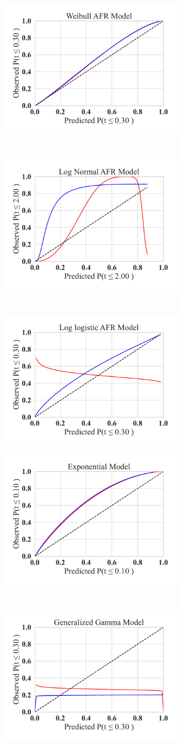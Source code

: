 \begin{figure}
	\begin{subfigure}
		\centering
		\includegraphics[width=.30\textwidth]{plots/weibull_qq.pdf}
	\end{subfigure}%
	~
	\begin{subfigure}
		\centering
		\includegraphics[width=.30\textwidth]{plots/log_normal_qq.pdf}
	\end{subfigure}
	~
	\begin{subfigure}
		\centering
		\includegraphics[width=.30\textwidth]{plots/log_logistic_qq.pdf}
	\end{subfigure}
 \begin{subfigure}
		\centering
		\includegraphics[width=.30\textwidth]{plots/exponential_qq.pdf}
	\end{subfigure}%
	~
	\begin{subfigure}
		\centering
		\includegraphics[width=.30\textwidth]{plots/gamma_qq.pdf}

\end{subfigure}
\end{figure}
